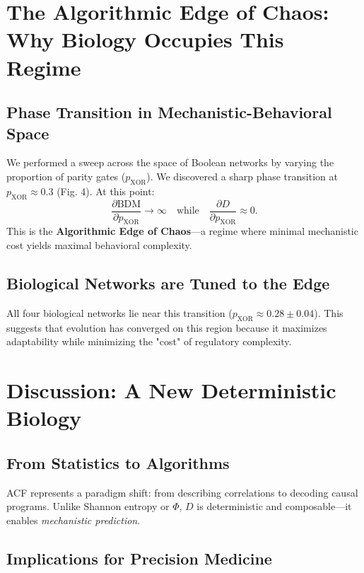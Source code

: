 \documentclass[10pt, twocolumn]{article}
\begin{document}
\section{The Algorithmic Edge of Chaos: Why Biology Occupies This Regime}

\subsection{Phase Transition in Mechanistic-Behavioral Space}

We performed a sweep across the space of Boolean networks by varying the proportion of parity gates ($p_{\text{XOR}}$). We discovered a sharp phase transition at $p_{\text{XOR}} \approx 0.3$ (Fig. 4). At this point:
\[
\frac{\partial \text{BDM}}{\partial p_{\text{XOR}}} \to \infty \quad \text{while} \quad \frac{\partial D}{\partial p_{\text{XOR}}} \approx 0.
\]
This is the \textbf{Algorithmic Edge of Chaos}—a regime where minimal mechanistic cost yields maximal behavioral complexity.

\subsection{Biological Networks are Tuned to the Edge}

All four biological networks lie near this transition ($p_{\text{XOR}} \approx 0.28 \pm 0.04$). This suggests that evolution has converged on this region because it maximizes adaptability while minimizing the "cost" of regulatory complexity.

\section{Discussion: A New Deterministic Biology}

\subsection{From Statistics to Algorithms}

ACF represents a paradigm shift: from describing correlations to decoding causal programs. Unlike Shannon entropy or $\Phi$, $D$ is deterministic and composable—it enables \textit{mechanistic prediction}.

\subsection{Implications for Precision Medicine}
\end{document}
